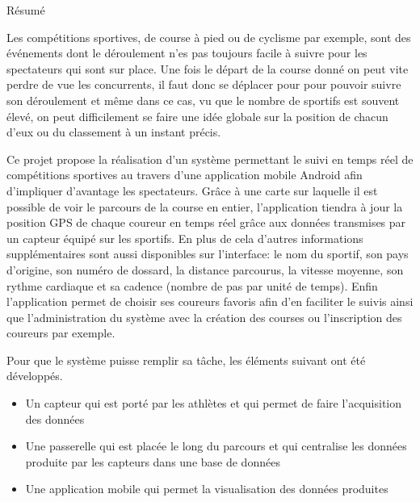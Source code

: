%
%







\pagestyle{fancy}

\LARGE{Résumé}

\begin{normalsize}
Les compétitions sportives, de course à pied ou de cyclisme par exemple, sont des événements dont le déroulement n'es pas toujours facile à suivre pour les spectateurs qui sont sur place. Une fois le départ de la course donné on peut vite perdre de vue les concurrents, il faut donc se déplacer pour pour pouvoir suivre son déroulement et même dans ce cas, vu que le nombre de sportifs est souvent élevé, on peut difficilement se faire une idée globale sur la position de chacun d'eux ou du classement à un instant précis. 

Ce projet propose la réalisation d’un système permettant le suivi en temps réel de compétitions sportives au travers d’une application mobile Android afin d'impliquer d'avantage les spectateurs. Grâce à une carte sur laquelle il est possible de voir le parcours de la course en entier, l'application tiendra à jour la position GPS de chaque coureur en temps réel grâce aux données transmises par un capteur équipé sur les sportifs. En plus de cela d'autres informations supplémentaires sont aussi disponibles sur l'interface: le nom du sportif, son pays d'origine, son numéro de dossard, la distance parcourus, la vitesse moyenne, son rythme cardiaque et sa cadence (nombre de pas par unité de temps). Enfin l'application permet de choisir ses coureurs favoris afin d'en faciliter le suivis ainsi que l'administration du système avec la création des courses ou l'inscription des coureurs par exemple.

Pour que le système puisse remplir sa tâche, les éléments suivant ont été développés.

\begin{itemize}
\item Un capteur qui est porté par les athlètes et qui permet de faire l'acquisition des données
\item Une passerelle qui est placée le long du parcours et qui centralise les données produite par les capteurs dans une base de données
\item Une application mobile qui permet la visualisation des données produites
\end{itemize}


\end{normalsize}
